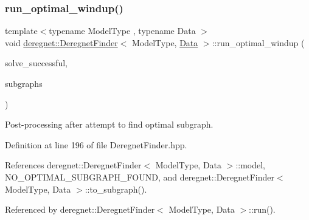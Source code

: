 \subsubsection{\texorpdfstring{run\+\_\+optimal\+\_\+windup()}{run\_optimal\_windup()}}
{\footnotesize\ttfamily template$<$typename Model\+Type , typename Data $>$ \\
void \hyperlink{classderegnet_1_1DeregnetFinder}{deregnet\+::\+Deregnet\+Finder}$<$ Model\+Type, \hyperlink{avgdrgnt_8cpp_a1d1235306db276e9b36acba1db1509e8}{Data} $>$\+::run\+\_\+optimal\+\_\+windup (\begin{DoxyParamCaption}\item[{bool}]{solve\+\_\+successful,  }\item[{std\+::vector$<$ \hyperlink{structderegnet_1_1Subgraph}{Subgraph} $>$ $\ast$}]{subgraphs }\end{DoxyParamCaption})\hspace{0.3cm}{\ttfamily [private]}}



Post-\/processing after attempt to find optimal subgraph. 



Definition at line 196 of file Deregnet\+Finder.\+hpp.



References deregnet\+::\+Deregnet\+Finder$<$ Model\+Type, Data $>$\+::model, N\+O\+\_\+\+O\+P\+T\+I\+M\+A\+L\+\_\+\+S\+U\+B\+G\+R\+A\+P\+H\+\_\+\+F\+O\+U\+ND, and deregnet\+::\+Deregnet\+Finder$<$ Model\+Type, Data $>$\+::to\+\_\+subgraph().



Referenced by deregnet\+::\+Deregnet\+Finder$<$ Model\+Type, Data $>$\+::run().



